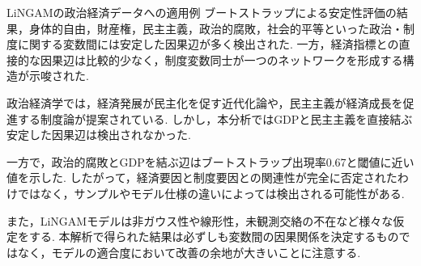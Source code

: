 \documentclass[uplatex, dvipdfmx]{jsarticle}
\begin{document}
\begin{exm}{LiNGAMの政治経済データへの適用例}
  ブートストラップによる安定性評価の結果，身体的自由，財産権，民主主義，政治的腐敗，社会的平等といった政治・制度に関する変数間には安定した因果辺が多く検出された.
  一方，経済指標との直接的な因果辺は比較的少なく，制度変数同士が一つのネットワークを形成する構造が示唆された.

  政治経済学では，経済発展が民主化を促す近代化論や，民主主義が経済成長を促進する制度論が提案されている.
  しかし，本分析ではGDPと民主主義を直接結ぶ安定した因果辺は検出されなかった.
  
  一方で，政治的腐敗とGDPを結ぶ辺はブートストラップ出現率0.67と閾値に近い値を示した.
  したがって，経済要因と制度要因との関連性が完全に否定されたわけではなく，サンプルやモデル仕様の違いによっては検出される可能性がある.

  また，LiNGAMモデルは非ガウス性や線形性，未観測交絡の不在など様々な仮定をする.
  本解析で得られた結果は必ずしも変数間の因果関係を決定するものではなく，モデルの適合度において改善の余地が大きいことに注意する.
\end{exm}
\end{document}
